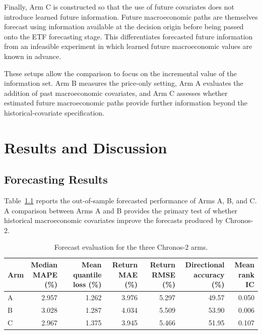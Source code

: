 \documentclass[12pt,a4paper,twoside,openany]{book}
\begin{document}
Finally, Arm C is constructed so that the use of future covariates
does not introduce learned future information. Future macroeconomic
paths are themselves forecast using information available at the
decision origin before being passed onto the ETF forecasting stage.
This differentiates forecasted future information from an infeasible
experiment in which learned future macroeconomic values are known
in advance.

These setups allow the comparison to focus on the
incremental value of the information set. Arm B measures the
price-only setting, Arm A evaluates the addition of past
macroeconomic covariates, and Arm C assesses whether estimated
future macroeconomic paths provide further information beyond the
historical-covariate specification.

\chapter{Results and Discussion}\label{results-and-discussion}

\section{Forecasting Results}
\label{forecasting-results}

Table~\ref{tab:forecast-evaluation} reports the out-of-sample
forecasted performance of Arms A, B, and C. A comparison between
Arms A and B provides the primary test of whether historical macroeconomic covariates
improve the forecasts produced by Chronos-2.

\begin{table}[htbp]
\centering
\caption{Forecast evaluation for the three Chronos-2 arms.}
\label{tab:forecast-evaluation}
\small
\begin{tabular}{lrrrrrr}
\toprule
Arm &
\shortstack{Median\\MAPE\\(\%)} &
\shortstack{Mean quantile\\loss (\%)} &
\shortstack{Return\\MAE (\%)} &
\shortstack{Return\\RMSE (\%)} &
\shortstack{Directional\\accuracy (\%)} &
\shortstack{Mean\\rank IC} \\
\midrule
A & 2.957 & 1.262 & 3.976 & 5.297 & 49.57 & 0.050 \\
B & 3.028 & 1.287 & 4.034 & 5.509 & 53.90 & 0.006 \\
C & 2.967 & 1.375 & 3.945 & 5.466 & 51.95 & 0.107 \\
\bottomrule
\end{tabular}
\end{table}
\end{document}
